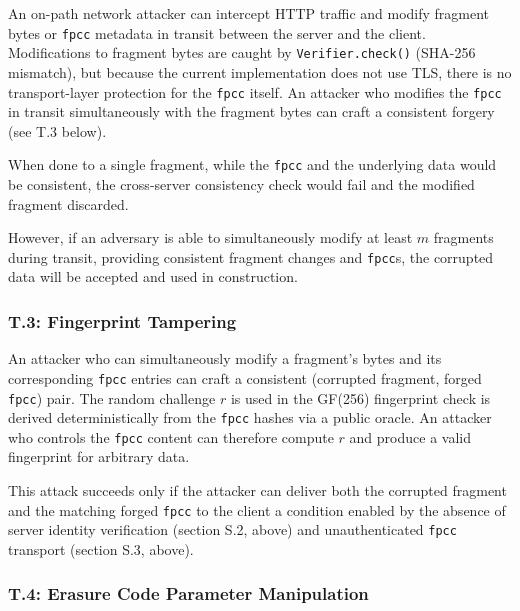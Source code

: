 \documentclass[../veristore_security_model.tex]{subfiles}
\begin{document}

An on-path network attacker can intercept HTTP traffic and modify fragment bytes or \texttt{fpcc} metadata in transit between the server and the client. Modifications to fragment bytes are caught by \texttt{Verifier.check()} (SHA-256 mismatch), but because the current implementation does not use TLS, there is no transport-layer protection for the \texttt{fpcc} itself. An attacker who modifies the \texttt{fpcc} in transit simultaneously with the fragment bytes can craft a consistent forgery (see T.3 below).

When done to a single fragment, while the \texttt{fpcc} and the underlying data would be consistent, the cross-server consistency check would fail and the modified fragment discarded.

However, if an adversary is able to simultaneously modify at least $m$ fragments during transit, providing consistent fragment changes and \texttt{fpcc}s, the corrupted data will be accepted and used in construction.

\subsubsection{T.3: Fingerprint Tampering}


An attacker who can simultaneously modify a fragment's bytes and its corresponding \texttt{fpcc} entries can craft a consistent (corrupted fragment, forged \texttt{fpcc}) pair. The random challenge $r$ is used in the GF(256) fingerprint check is derived deterministically from the \texttt{fpcc} hashes via a public oracle. An attacker who controls the \texttt{fpcc} content can therefore compute $r$ and produce a valid fingerprint for arbitrary data.

This attack succeeds only if the attacker can deliver both the corrupted fragment and the matching forged \texttt{fpcc} to the client \textendash{} a condition enabled by the absence of server identity verification (section S.2, above) and unauthenticated \texttt{fpcc} transport (section S.3, above).

\subsubsection{T.4: Erasure Code Parameter Manipulation}
\end{document}
